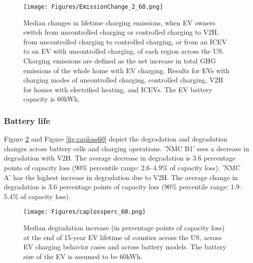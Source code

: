 \documentclass[11pt,preprint]{elsarticle}
\begin{document}
\begin{figure}[H]
    \centering
    \texttt{[image: Figures/EmissionChange\_2\_60.png]}
    \caption{Median changes in lifetime charging emissions, when EV owners switch from uncontrolled charging or controlled charging to V2H, from uncontrolled charging to controlled charging, or from an ICEV to an EV with uncontrolled charging, of each region across the US. Charging emissions are defined as the net increase in total GHG emissions of the whole home with EV charging. Results for EVs with charging modes of uncontrolled charging, controlled charging, V2H for homes with electrified heating, and ICEVs. The EV battery capacity is 60kWh.}
    \label{fig:emissionchange60}
\end{figure}



\subsubsection{Battery life}


Figure \ref{fig:caploss60perc} and Figure \ref{fig:caploss60} depict the degradation and degradation changes across battery cells and charging operations. 'NMC B1' sees a decrease in degradation with V2H. The average decrease in degradation is 3.6 percentage points of capacity loss (90\% percentile range: 2.6--4.9\% of capacity loss). 'NMC A' has the highest increase in degradation due to V2H. The average change in degradation is 3.6 percentage points of capacity loss (90\% percentile range: 1.9--5.4\% of capacity loss).

\begin{figure}[H]
    \centering
    \texttt{[image: Figures/caplossperc\_60.png]}
    \caption{Median degradation increase (in percentage points of capacity loss) at the end of 15-year EV lifetime of counties across the US, across EV charging behavior cases and across battery models. The battery size of the EV is assumed to be 60kWh.}
    \label{fig:caploss60perc}
\end{figure}
\end{document}
